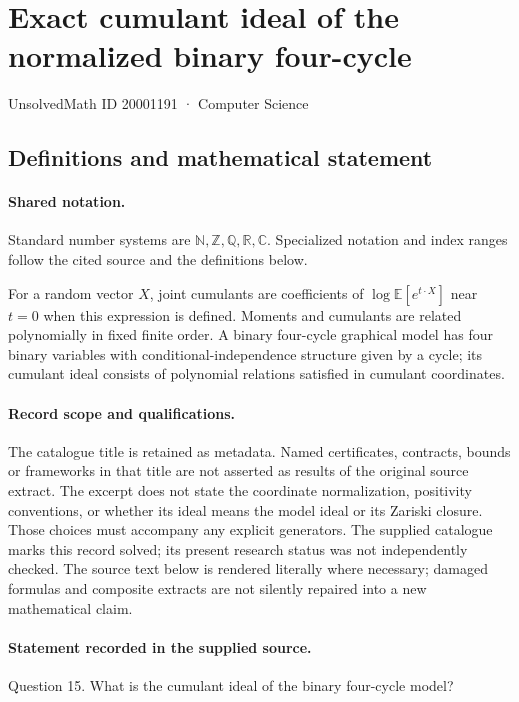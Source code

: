 \documentclass[11pt]{article}
\begin{document}
\setcounter{section}{20001190}
\section{Exact cumulant ideal of the normalized binary four-cycle}\label{20001191}
{\small\sffamily UnsolvedMath ID 20001191 · Computer Science}
\subsection{Definitions and mathematical statement}

\paragraph{Shared notation.}Standard number systems are $\mathbb N,\mathbb Z,\mathbb Q,\mathbb R,\mathbb C$. Specialized notation and index ranges follow the cited source and the definitions below.


For a random vector $X$, joint cumulants are coefficients of $\log\mathbb E[e^{t\cdot X}]$ near $t=0$ when this expression is defined. Moments and cumulants are related polynomially in fixed finite order. A binary four-cycle graphical model has four binary variables with conditional-independence structure given by a cycle; its cumulant ideal consists of polynomial relations satisfied in cumulant coordinates.
\paragraph{Record scope and qualifications.}
The catalogue title is retained as metadata. Named certificates, contracts, bounds or frameworks in that title are not asserted as results of the original source extract.
The excerpt does not state the coordinate normalization, positivity conventions, or whether its ideal means the model ideal or its Zariski closure. Those choices must accompany any explicit generators. The supplied catalogue marks this record solved; its present research status was not independently checked.
The source text below is rendered literally where necessary; damaged formulas and composite extracts are not silently repaired into a new mathematical claim.
\paragraph{Statement recorded in the supplied source.}
Question 15. What is the cumulant ideal of the binary four-cycle model?
\end{document}
